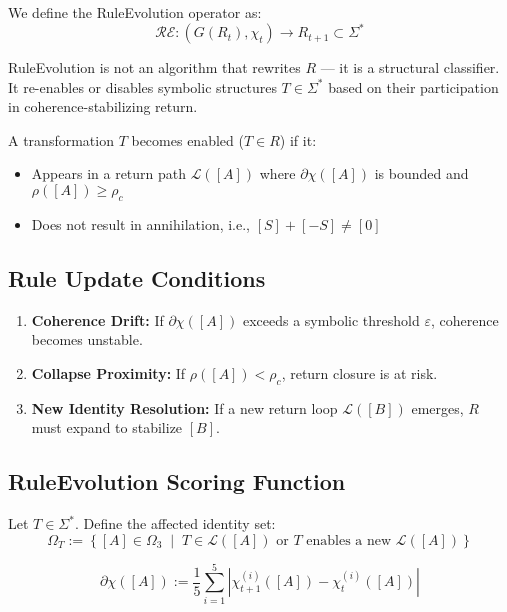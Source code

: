 We define the RuleEvolution operator as:
\begin{equation} \label{eq:ruleevolution-operator}
\mathcal{RE} : (G(R_t), \chi_t) \longrightarrow R_{t+1} \subset \Sigma^*
\end{equation}

RuleEvolution is not an algorithm that rewrites $R$ — it is a structural classifier.  
It re-enables or disables symbolic structures $T \in \Sigma^*$ based on their participation in coherence-stabilizing return.

A transformation $T$ becomes enabled ($T \in R$) if it:
\begin{itemize}
  \item Appears in a return path $\mathcal{L}([A])$ where $\partial \chi([A])$ is bounded and $\rho([A]) \geq \rho_c$
  \item Does not result in annihilation, i.e., $[S] + [-S] \ne [0]$
\end{itemize}

\subsection{Rule Update Conditions} \label{rule-update-conditions}

\begin{enumerate}
  \item \textbf{Coherence Drift:} If $\partial \chi([A])$ exceeds a symbolic threshold $\varepsilon$, coherence becomes unstable.
  \item \textbf{Collapse Proximity:} If $\rho([A]) < \rho_c$, return closure is at risk.
  \item \textbf{New Identity Resolution:} If a new return loop $\mathcal{L}([B])$ emerges, $R$ must expand to stabilize $[B]$.
\end{enumerate}

\subsection{RuleEvolution Scoring Function} \label{ruleevolution-scoring-function}

Let $T \in \Sigma^*$. Define the affected identity set:
\begin{equation} \label{eq:affected-set}
\Omega_T := \left\{ [A] \in \Omega_3 \;\middle|\; T \in \mathcal{L}([A]) \text{ or } T \text{ enables a new } \mathcal{L}([A]) \right\}
\end{equation}

\begin{definition} \label{def:scalar-drift}
\begin{equation} \label{eq:drift-metric}
\partial \chi([A]) := \frac{1}{5} \sum_{i=1}^{5} \left| \chi_{t+1}^{(i)}([A]) - \chi_t^{(i)}([A]) \right|
\end{equation}
\end{definition}

